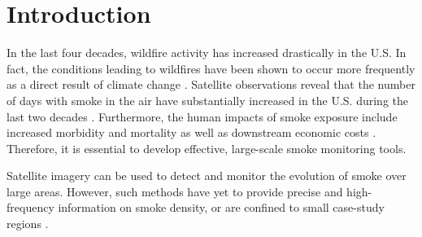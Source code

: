 \documentclass{article}
\begin{document}
\section{Introduction}
In the last four decades, wildfire activity has increased drastically in the U.S. In fact, the conditions leading to wildfires have been shown to occur more frequently as a direct result of climate change \citep{wildfire-risk}. Satellite observations reveal that the number of days with smoke in the air have substantially increased in the U.S. during the last two decades \citep{wildfire-risk}. Furthermore, the human impacts of smoke exposure include increased morbidity and mortality as well as downstream economic costs \citep{health-impacts}. Therefore, it is essential to develop effective, large-scale smoke monitoring tools. 

Satellite imagery can be used to detect and monitor the evolution of smoke over large areas.
However, such methods have yet to provide precise and high-frequency information on smoke density, or are confined to small case-study regions \citep{Wen2021WildfireSP, canada-smoke-height, autralia-smoke-ml}. 
\end{document}
